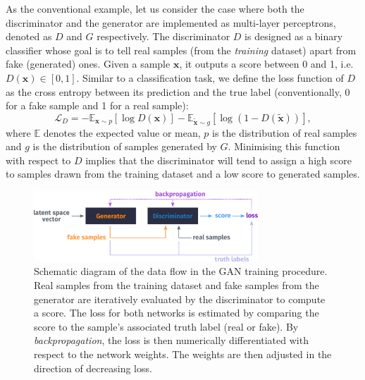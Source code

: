 As the conventional example, let us consider the case where both the
discriminator and the generator are implemented as multi-layer perceptrons,
denoted as $D$ and $G$ respectively. 
The discriminator $D$ is designed as a binary classifier whose goal is to tell
real samples (from the \emph{training} dataset) apart from fake (generated)
ones. Given a sample $\bm{x}$, it outputs a score between 0 and 1, i.e.\ 
$D(\bm{x}) \in [0, 1]$. Similar to a classification task, we define the loss
function of $D$ as the cross entropy between its prediction and the true label
(conventionally, 0 for a fake sample and 1 for a real sample):
\begin{equation}\label{eq:D_loss}
    \mathcal{L}_D =
    -\mathbb{E}_{\bm{x} \sim p} [ \log D(\bm{x}) ] -
    \mathbb{E}_{\tilde{\bm{x}} \sim g} [ \log( 1 - D(\tilde{\bm{x}}) )],
\end{equation}
where $\mathbb{E}$ denotes the expected value or mean, $p$ is the distribution
of real samples and $g$ is the distribution of samples generated by $G$.
Minimising this function with respect to $D$ implies that the discriminator will
tend to assign a high score to samples drawn from the training dataset and a low
score to generated samples.


\begin{figure}
    \centering
    \hspace{-2cm}
    \includegraphics[width=0.75\textwidth]{chapter4/gan_diagram.pdf}
    \caption{
        Schematic diagram of the data flow in the GAN training procedure. Real samples from the training dataset and fake samples from the generator
        are iteratively evaluated by the discriminator to compute a score. The loss for
        both networks is estimated by comparing the score to the sample's associated
        truth label (real or fake). By \emph{backpropagation}, the loss is then
        numerically differentiated with respect to the network weights. The
        weights are then adjusted in the direction of decreasing loss.
    }
    \label{fig:gan_diagram}
\end{figure}


